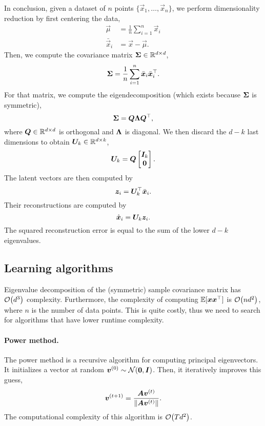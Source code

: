 \begin{important}
    In conclusion, given a dataset of $n$ points $\{ \vec{x}_1, \ldots, \vec{x}_n \}$, we perform
    dimensionality reduction by first centering the data,
    \begin{align*}
        \vec{\mu}       & = \frac{1}{n} \sum_{i=1}^{n} \vec{x}_i \\
        \bar{\vec{x}}_i & = \vec{x} - \vec{\mu}.
    \end{align*}
    Then, we compute the covariance matrix $\bm{\Sigma} \in \mathbb{R}^{d \times d}$, \[
        \bm{\Sigma} = \frac{1}{n} \sum_{i=1}^{n} \bar{\bm{x}}_i \bar{\bm{x}}_i^\top.
    \]
    For that matrix, we compute the eigendecomposition (which exists because $\bm{\Sigma}$ is
    symmetric), \[
        \bm{\Sigma} = \bm{Q} \bm{\Lambda} \bm{Q}^\top,
    \]
    where $\bm{Q} \in \mathbb{R}^{d \times d}$ is orthogonal and $\bm{\Lambda}$ is diagonal. We then discard
    the $d-k$ last dimensions to obtain $\bm{U}_k \in \mathbb{R}^{d \times k}$, \[
        \bm{U}_k = \bm{Q} \begin{bmatrix} \bm{I}_k \\ \bm{0} \end{bmatrix}.
    \]
    The latent vectors are then computed by \[
        \bm{z}_i = \bm{U}_k^\top \bar{\bm{x}}_i.
    \]
    Their reconstructions are computed by \[
        \hat{\bm{x}}_i = \bm{U}_k \bm{z}_i.
    \]
    The squared reconstruction error is equal to the sum of the lower $d-k$ eigenvalues.
\end{important}

\subsection{Learning algorithms}

Eigenvalue decomposition of the (symmetric) sample covariance matrix has $\bigo{d^3}$ complexity.
Furthermore, the complexity of computing $\mathbb{E}[\bm{x}\bm{x}^\top]$ is $\bigo{nd^2}$, where
$n$ is the number of data points. This is quite costly, thus we
need to search for algorithms that have lower runtime complexity.

\paragraph{Power method.}

The power method is a recursive algorithm for computing principal eigenvectors. It initializes a
vector at random $\bm{v}^{(0)} \sim \mathcal{N}(\bm{0}, \bm{I})$. Then, it iteratively improves
this guess, \[
    \bm{v}^{(t+1)} = \frac{\bm{A}\bm{v}^{(t)}}{\| \bm{A} \bm{v}^{(t)} \|}.
\]
The computational complexity of this algorithm is $\bigo{Td^2}$.

